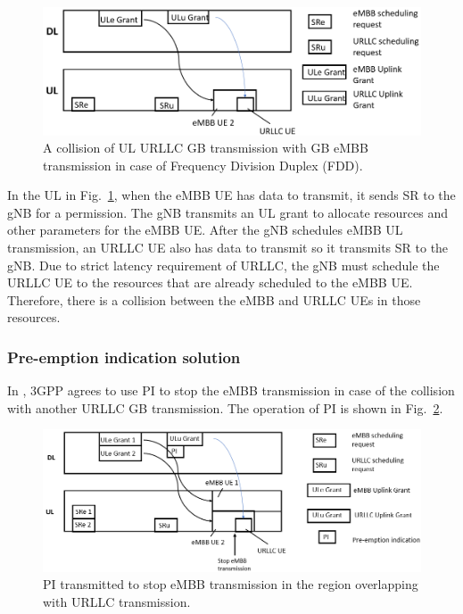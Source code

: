 \documentclass{ieeeaccess}
\begin{document}
\begin{figure}[htbp]
\centerline{\includegraphics[scale=0.33]{fig7.PNG}}
\caption{A collision of UL URLLC GB transmission with GB eMBB transmission in case of Frequency Division Duplex (FDD).}
\label{fig7}
\vspace{-4mm}
\end{figure}

In the UL in Fig.~\ref{fig7}, when the eMBB UE has data to transmit, it sends SR to the gNB for a permission. The gNB transmits an UL grant to allocate resources and other parameters for the eMBB UE. After the gNB schedules eMBB UL transmission, an URLLC UE also has data to transmit so it transmits SR to the gNB. Due to strict latency requirement of URLLC, the gNB must schedule the URLLC UE to the resources that are already scheduled to the eMBB UE. Therefore, there is a collision between the eMBB and URLLC UEs in those resources.

\subsubsection{Pre-emption indication solution}

In \cite{ref20}, 3GPP agrees to use PI to stop the eMBB transmission in case of the collision with another URLLC GB transmission. The operation of PI is shown in Fig.~\ref{fig8}.

\begin{figure}[htbp]
\centerline{\includegraphics[scale=0.33]{fig8.PNG}}
\caption{PI transmitted to stop eMBB transmission in the region overlapping with URLLC transmission.}
\label{fig8}
\vspace{-2mm}
\end{figure}
\end{document}
